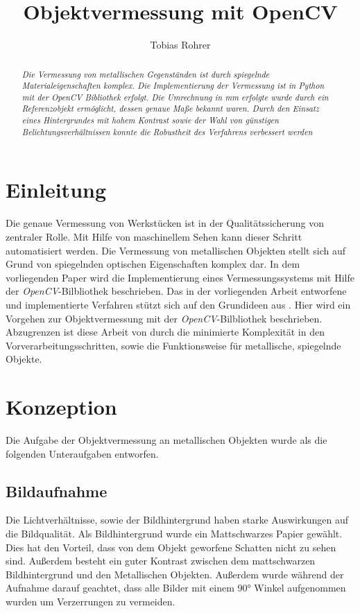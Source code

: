 \documentclass[twocolumn,10pt]{asme2ej}
\title{Objektvermessung mit OpenCV}
\author{Tobias Rohrer
    \affiliation{
	Data Science (Master)\\
	Hochschule Darmstadt\\
    Email: Tobias.Rohrer@outlook.com
    }	
}
\begin{document}
\maketitle    

\begin{abstract}
{\it Die Vermessung von metallischen Gegenständen ist durch spiegelnde Materialeigenschaften komplex. Die Implementierung der Vermessung ist in Python mit der OpenCV \cite{opencv_library} Bibliothek erfolgt. Die Umrechnung in mm erfolgte wurde durch ein Referenzobjekt ermöglicht, dessen genaue Maße bekannt waren.  Durch den Einsatz eines Hintergrundes mit hohem Kontrast sowie der Wahl von günstigen Belichtungsverhältnissen konnte die Robustheit des Verfahrens verbessert werden
}
\end{abstract}

\section{Einleitung}
Die genaue Vermessung von Werkstücken ist in der Qualitätssicherung von zentraler Rolle. Mit Hilfe von maschinellem Sehen kann dieser Schritt automatisiert werden. Die Vermessung von metallischen Objekten stellt sich auf Grund von spiegelnden optischen Eigenschaften komplex dar. In dem vorliegenden Paper wird die Implementierung eines Vermessungssystems mit Hilfe der \emph{OpenCV}-Bilbliothek beschrieben. Das in der vorliegenden Arbeit entworfene und implementierte Verfahren stützt sich auf den Grundideen aus \cite{PyImageSearch}. Hier wird ein Vorgehen zur Objektvermessung mit der  \emph{OpenCV}-Bilbliothek beschrieben. Abzugrenzen ist diese Arbeit von \cite{PyImageSearch} durch die minimierte Komplexität in den Vorverarbeitungsschritten, sowie die Funktionsweise für metallische, spiegelnde Objekte.

\section{Konzeption}
Die Aufgabe der Objektvermessung an metallischen Objekten wurde als die folgenden Unteraufgaben entworfen.

\subsection{Bildaufnahme}
Die Lichtverhältnisse, sowie der Bildhintergrund haben starke Auswirkungen auf die Bildqualität. Als Bildhintergrund wurde ein Mattschwarzes Papier gewählt. Dies hat den Vorteil, dass von dem Objekt geworfene Schatten nicht zu sehen sind. Außerdem besteht ein guter Kontrast zwischen dem mattschwarzen Bildhintergrund und den Metallischen Objekten. Außerdem wurde während der Aufnahme darauf geachtet, dass alle Bilder mit einem \ang{90} Winkel aufgenommen wurden um Verzerrungen zu vermeiden.
\end{document}
